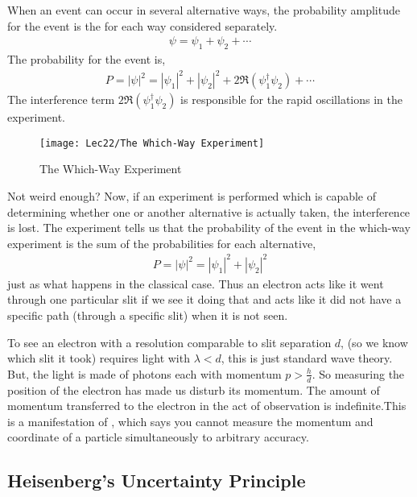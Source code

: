 When an event can occur in several alternative ways, the probability amplitude for the event is the  for each way considered separately. 
\begin{align*}
    \psi=\psi_1+\psi_2+\cdots
\end{align*}
The probability for the event is, 
\begin{align*}
    P=|\psi|^2=|\psi_1|^2+|\psi_2|^2+2\mathfrak{R} (\psi_1^{\dagger}\psi_2)+\cdots
\end{align*}
The interference term $2\mathfrak{R} (\psi_1^{\dagger}\psi_2)$ is responsible for the rapid oscillations in the experiment. 

\begin{figure}[H]
    \centering
    \texttt{[image: Lec22/The Which-Way Experiment]}
    \caption{The Which-Way Experiment}
\end{figure}


Not weird enough? Now, if an experiment is performed which is capable of determining whether one or another alternative is actually taken, the interference is lost. The experiment tells us that the probability of the event in the which-way experiment is the sum of the probabilities for each alternative,
\begin{align*}
    P=|\psi|^2=|\psi_1|^2+|\psi_2|^2
\end{align*} 
just as what happens in the classical case. Thus an electron acts like it went through one particular slit if we see it doing that and acts like it did not have a specific path (through a specific slit) when it is not seen.

To see an electron with a resolution comparable to slit separation $d$, (so we know which slit it took) requires light with $\lambda < d$, this is just standard wave theory. But, the light is made of photons each with momentum $p > \frac{h}{d}$. So measuring the position of the electron has made us disturb its momentum. The amount of momentum transferred to the electron in the act of observation is indefinite.This is a manifestation of , which says you cannot measure the momentum and coordinate of a particle simultaneously to arbitrary accuracy.

\subsection{Heisenberg’s Uncertainty Principle}

